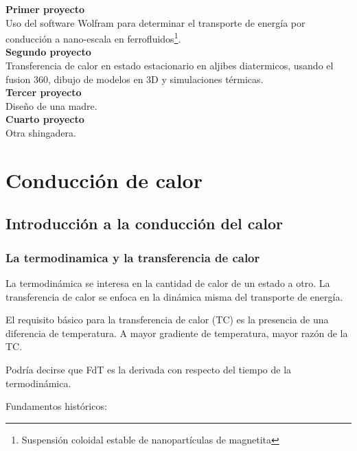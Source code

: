 \documentclass[11pt]{report}
\theoremstyle{plain}
\theoremstyle{definition}
\begin{document}
\textbf{Primer proyecto}\\
Uso del software Wolfram para determinar el transporte de energía por conducción a nano-escala en ferrofluidos\footnote{Suspensión coloidal estable de nanopartículas de magnetita}.\\


\textbf{Segundo proyecto}\\
Transferencia de calor en estado estacionario en aljibes diatermicos, usando el fusion 360, dibujo de modelos en 3D y simulaciones térmicas.\\


\textbf{Tercer proyecto}\\
Diseño de una madre.\\


\textbf{Cuarto proyecto}\\
Otra shingadera.\\


\chapter{Conducción de calor}

\section{Introducción a la conducción del calor}


\subsection{La termodinamica y la transferencia de calor}

La termodinámica se interesa en la cantidad de calor de un estado a otro. La transferencia de calor se enfoca en la dinámica misma del transporte de energía.

El requisito básico para la transferencia de calor (TC) es la presencia de una diferencia de temperatura. A mayor gradiente de temperatura, mayor razón de la TC.

Podría decirse que FdT es la derivada con respecto del tiempo de la termodinámica.

Fundamentos históricos:
\end{document}
